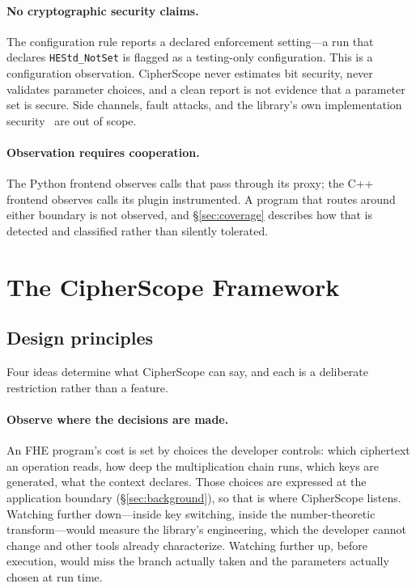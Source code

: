 \documentclass[sigconf,nonacm]{acmart}
\begin{document}
\paragraph{No cryptographic security claims.} The configuration rule reports
a declared enforcement setting---a run that declares
\texttt{HEStd\_NotSet} is flagged as a testing-only configuration. This is a
configuration observation. CipherScope never estimates bit security, never
validates parameter choices, and a clean report is not evidence that a
parameter set is secure. Side channels, fault attacks, and the library's own
implementation security~\cite{safetycentric2025} are out of scope.

\paragraph{Observation requires cooperation.} The Python frontend observes
calls that pass through its proxy; the C++ frontend observes calls its
plugin instrumented. A program that routes around either boundary is not
observed, and \S\ref{sec:coverage} describes how that is detected and
classified rather than silently tolerated.

\section{The CipherScope Framework}
\label{sec:framework}

\subsection{Design principles}
\label{sec:principles}

Four ideas determine what CipherScope can say, and each is a deliberate
restriction rather than a feature.

\paragraph{Observe where the decisions are made.} An FHE program's cost is
set by choices the developer controls: which ciphertext an operation reads,
how deep the multiplication chain runs, which keys are generated, what the
context declares. Those choices are expressed at the application boundary
(\S\ref{sec:background}), so that is where CipherScope listens. Watching
further down---inside key switching, inside the number-theoretic
transform---would measure the library's engineering, which the developer
cannot change and other tools already characterize. Watching further up,
before execution, would miss the branch actually taken and the parameters
actually chosen at run time.
\end{document}
